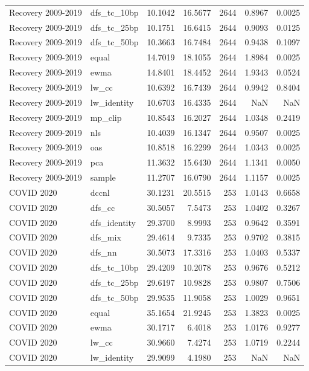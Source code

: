 \begin{tabular}{llrrrrr}
Recovery 2009-2019 & dfs_tc_10bp & 10.1042 & 16.5677 & 2644 & 0.8967 & 0.0025 \\
Recovery 2009-2019 & dfs_tc_25bp & 10.1751 & 16.6415 & 2644 & 0.9093 & 0.0125 \\
Recovery 2009-2019 & dfs_tc_50bp & 10.3663 & 16.7484 & 2644 & 0.9438 & 0.1097 \\
Recovery 2009-2019 & equal & 14.7019 & 18.1055 & 2644 & 1.8984 & 0.0025 \\
Recovery 2009-2019 & ewma & 14.8401 & 18.4452 & 2644 & 1.9343 & 0.0524 \\
Recovery 2009-2019 & lw_cc & 10.6392 & 16.7439 & 2644 & 0.9942 & 0.8404 \\
Recovery 2009-2019 & lw_identity & 10.6703 & 16.4335 & 2644 & NaN & NaN \\
Recovery 2009-2019 & mp_clip & 10.8543 & 16.2027 & 2644 & 1.0348 & 0.2419 \\
Recovery 2009-2019 & nls & 10.4039 & 16.1347 & 2644 & 0.9507 & 0.0025 \\
Recovery 2009-2019 & oas & 10.8518 & 16.2299 & 2644 & 1.0343 & 0.0025 \\
Recovery 2009-2019 & pca & 11.3632 & 15.6430 & 2644 & 1.1341 & 0.0050 \\
Recovery 2009-2019 & sample & 11.2707 & 16.0790 & 2644 & 1.1157 & 0.0025 \\
COVID 2020 & dccnl & 30.1231 & 20.5515 & 253 & 1.0143 & 0.6658 \\
COVID 2020 & dfs_cc & 30.5057 & 7.5473 & 253 & 1.0402 & 0.3267 \\
COVID 2020 & dfs_identity & 29.3700 & 8.9993 & 253 & 0.9642 & 0.3591 \\
COVID 2020 & dfs_mix & 29.4614 & 9.7335 & 253 & 0.9702 & 0.3815 \\
COVID 2020 & dfs_nn & 30.5073 & 17.3316 & 253 & 1.0403 & 0.5337 \\
COVID 2020 & dfs_tc_10bp & 29.4209 & 10.2078 & 253 & 0.9676 & 0.5212 \\
COVID 2020 & dfs_tc_25bp & 29.6197 & 10.9828 & 253 & 0.9807 & 0.7506 \\
COVID 2020 & dfs_tc_50bp & 29.9535 & 11.9058 & 253 & 1.0029 & 0.9651 \\
COVID 2020 & equal & 35.1654 & 21.9245 & 253 & 1.3823 & 0.0025 \\
COVID 2020 & ewma & 30.1717 & 6.4018 & 253 & 1.0176 & 0.9277 \\
COVID 2020 & lw_cc & 30.9660 & 7.4274 & 253 & 1.0719 & 0.2244 \\
COVID 2020 & lw_identity & 29.9099 & 4.1980 & 253 & NaN & NaN \\

\end{tabular}
